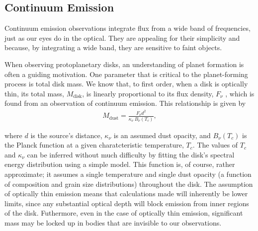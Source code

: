 \subsection{Continuum Emission}
\label{section:continuum_emission}

%


Continuum emission observations integrate flux from a wide band of frequencies, just as our eyes do in the optical. They are appealing for their simplicity and because, by integrating a wide band, they are sensitive to faint objects.

When observing protoplanetary disks, an understanding of planet formation is often a guiding motivation. One parameter that is critical to the planet-forming process is total disk mass. We know that, to first order, when a disk is optically thin, its total mass, $M_{\text{disk}}$, is linearly proportional to its flux density, $F_{\nu}$ \citep{Hildebrand1983}, which is found from an observation of continuum emission. This relationship is given by
\begin{align}
M_{\text{dust}} = \frac{F_{\nu} d^2}{\kappa_{\nu}\ B_{\nu}(T_c)},
\end{align}

\noindent where $d$ is the source's distance, $\kappa_{\nu}$ is an assumed dust opacity, and $B_{\nu}(T_c)$ is the Planck function at a given charatcteristic temperature, $T_c$. The values of $T_c$ and $\kappa_{\nu}$ can be inferred without much difficulty by fitting the disk's spectral energy distribution using a simple model. This function is, of course, rather approximate; it assumes a single temperature and single dust opacity (a function of composition and grain size distributions) throughout the disk. The assumption of optically thin emission means that calculations made will inherently be lower limits, since any substantial optical depth will block emission from inner regions of the disk. Futhermore, even in the case of optically thin emission, significant mass may be locked up in bodies that are invisible to our observations.


